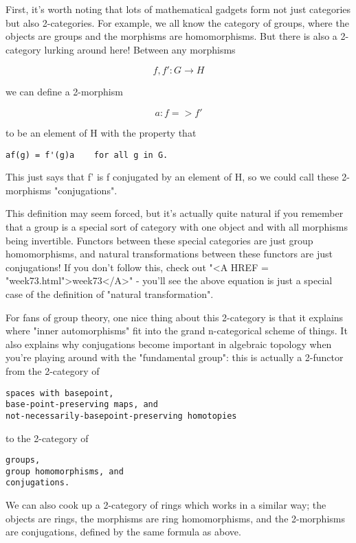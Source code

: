 First, it's worth noting that lots of mathematical gadgets form
not just categories but also 2-categories.  For example, we all
know the category of groups, where the objects are groups and the
morphisms are homomorphisms.  But there is also a 2-category lurking
around here!  Between any morphisms 

$$
f,f': G \to  H
$$
    

we can define a 2-morphism 

$$
a: f => f'
$$
    

to be an element of H with the property that 

\begin{verbatim}
af(g) = f'(g)a    for all g in G.   
\end{verbatim}
    

This just says that f' is f conjugated by an element of H, so we
could call these 2-morphisms "conjugations".  

This definition may seem forced, but it's actually quite natural if you 
remember that a group is a special sort of category with one object and 
with all morphisms being invertible.  Functors between these special 
categories are just group homomorphisms, and natural transformations
between these functors are just conjugations!  If you don't follow this,
check out "<A HREF = "week73.html">week73</A>" - you'll see the above equation is just a special
case of the definition of "natural transformation".

For fans of group theory, one nice thing about this 2-category is that
it explains where "inner automorphisms" fit into the grand n-categorical 
scheme of things.  It also explains why conjugations become important in 
algebraic topology when you're playing around with the "fundamental group":
this is actually a 2-functor from the 2-category of

\begin{verbatim}
spaces with basepoint,
base-point-preserving maps, and
not-necessarily-basepoint-preserving homotopies
\end{verbatim}
    

to the 2-category of

\begin{verbatim}
groups,
group homomorphisms, and
conjugations.
\end{verbatim}
    

We can also cook up a 2-category of rings which works in a similar way;
the objects are rings, the morphisms are ring homomorphisms, and the
2-morphisms are conjugations, defined by the same formula as above.

